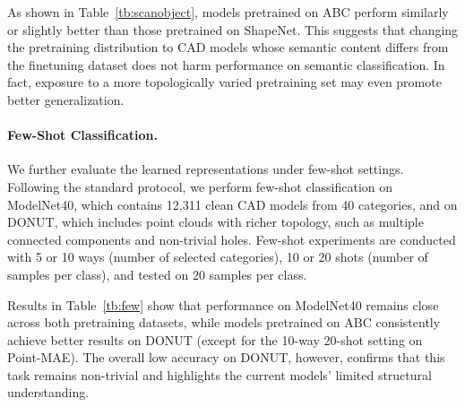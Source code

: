 As shown in Table~\ref{tb:scanobject}, models pretrained on ABC perform similarly or slightly better than those pretrained on ShapeNet. This suggests that changing the pretraining distribution to CAD models whose semantic content differs from the finetuning dataset does not harm performance on semantic classification. In fact, exposure to a more topologically varied pretraining set may even promote better generalization.



\paragraph{Few-Shot Classification.}
We further evaluate the learned representations under few-shot settings. Following the standard protocol, we perform few-shot classification on ModelNet40, which contains 12,311 clean CAD models from 40 categories, and on DONUT, which includes point clouds with richer topology, such as multiple connected components and non-trivial holes. Few-shot experiments are conducted with 5 or 10 ways (number of selected categories), 10 or 20 shots (number of samples per class), and tested on 20 samples per class.

Results in Table~\ref{tb:few} show that performance on ModelNet40 remains close across both pretraining datasets, while models pretrained on ABC consistently achieve better results on DONUT (except for the 10-way 20-shot setting on Point-MAE). The overall low accuracy on DONUT, however, confirms that this task remains non-trivial and highlights the current models’ limited structural understanding.
